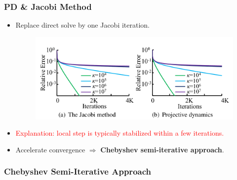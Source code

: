 \documentclass[serif,mathserif]{beamer}
\newcommand{\TODO}[1]{\textcolor{red}{#1}}
\begin{document}
\begin{frame}
 \frametitle{PD \& Jacobi Method}
 \begin{itemize}
  \item Replace direct solve by one Jacobi iteration.
  \begin{figure}
   \centering
   \includegraphics[scale=0.25]{img/conv_comp}
  \end{figure}
  \item \TODO{Explanation: local step is typically stabilized within a few iterations.}
  \item Accelerate convergence $\Rightarrow$ \textbf{Chebyshev semi-iterative approach}.
 \end{itemize}
\end{frame}

\begin{frame}
  \frametitle{Chebyshev Semi-Iterative Approach}
\end{frame}
\end{document}

